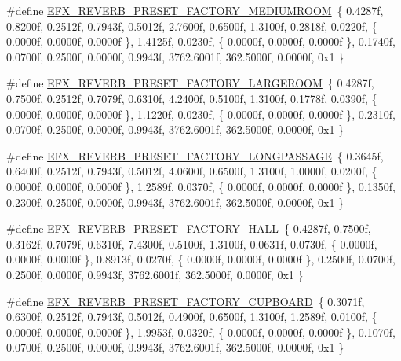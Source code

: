 \begin{DoxyCompactItemize}
\item 
\#define \hyperlink{efx-presets_8h_afdd5df2559d5c60aa4a4729412405d06}{E\+F\+X\+\_\+\+R\+E\+V\+E\+R\+B\+\_\+\+P\+R\+E\+S\+E\+T\+\_\+\+F\+A\+C\+T\+O\+R\+Y\+\_\+\+M\+E\+D\+I\+U\+M\+R\+O\+OM}~\{ 0.\+4287f, 0.\+8200f, 0.\+2512f, 0.\+7943f, 0.\+5012f, 2.\+7600f, 0.\+6500f, 1.\+3100f, 0.\+2818f, 0.\+0220f, \{ 0.\+0000f, 0.\+0000f, 0.\+0000f \}, 1.\+4125f, 0.\+0230f, \{ 0.\+0000f, 0.\+0000f, 0.\+0000f \}, 0.\+1740f, 0.\+0700f, 0.\+2500f, 0.\+0000f, 0.\+9943f, 3762.\+6001f, 362.\+5000f, 0.\+0000f, 0x1 \}
\item 
\#define \hyperlink{efx-presets_8h_a702eccce6fa335c50cd88b25585c99ed}{E\+F\+X\+\_\+\+R\+E\+V\+E\+R\+B\+\_\+\+P\+R\+E\+S\+E\+T\+\_\+\+F\+A\+C\+T\+O\+R\+Y\+\_\+\+L\+A\+R\+G\+E\+R\+O\+OM}~\{ 0.\+4287f, 0.\+7500f, 0.\+2512f, 0.\+7079f, 0.\+6310f, 4.\+2400f, 0.\+5100f, 1.\+3100f, 0.\+1778f, 0.\+0390f, \{ 0.\+0000f, 0.\+0000f, 0.\+0000f \}, 1.\+1220f, 0.\+0230f, \{ 0.\+0000f, 0.\+0000f, 0.\+0000f \}, 0.\+2310f, 0.\+0700f, 0.\+2500f, 0.\+0000f, 0.\+9943f, 3762.\+6001f, 362.\+5000f, 0.\+0000f, 0x1 \}
\item 
\#define \hyperlink{efx-presets_8h_a2e0c4cc4ac7d102d391c8edc50417df5}{E\+F\+X\+\_\+\+R\+E\+V\+E\+R\+B\+\_\+\+P\+R\+E\+S\+E\+T\+\_\+\+F\+A\+C\+T\+O\+R\+Y\+\_\+\+L\+O\+N\+G\+P\+A\+S\+S\+A\+GE}~\{ 0.\+3645f, 0.\+6400f, 0.\+2512f, 0.\+7943f, 0.\+5012f, 4.\+0600f, 0.\+6500f, 1.\+3100f, 1.\+0000f, 0.\+0200f, \{ 0.\+0000f, 0.\+0000f, 0.\+0000f \}, 1.\+2589f, 0.\+0370f, \{ 0.\+0000f, 0.\+0000f, 0.\+0000f \}, 0.\+1350f, 0.\+2300f, 0.\+2500f, 0.\+0000f, 0.\+9943f, 3762.\+6001f, 362.\+5000f, 0.\+0000f, 0x1 \}
\item 
\#define \hyperlink{efx-presets_8h_a77f1d495628c3b9943873adc18f5a979}{E\+F\+X\+\_\+\+R\+E\+V\+E\+R\+B\+\_\+\+P\+R\+E\+S\+E\+T\+\_\+\+F\+A\+C\+T\+O\+R\+Y\+\_\+\+H\+A\+LL}~\{ 0.\+4287f, 0.\+7500f, 0.\+3162f, 0.\+7079f, 0.\+6310f, 7.\+4300f, 0.\+5100f, 1.\+3100f, 0.\+0631f, 0.\+0730f, \{ 0.\+0000f, 0.\+0000f, 0.\+0000f \}, 0.\+8913f, 0.\+0270f, \{ 0.\+0000f, 0.\+0000f, 0.\+0000f \}, 0.\+2500f, 0.\+0700f, 0.\+2500f, 0.\+0000f, 0.\+9943f, 3762.\+6001f, 362.\+5000f, 0.\+0000f, 0x1 \}
\item 
\#define \hyperlink{efx-presets_8h_a92403add280fb6a386b7c72ad1a39d32}{E\+F\+X\+\_\+\+R\+E\+V\+E\+R\+B\+\_\+\+P\+R\+E\+S\+E\+T\+\_\+\+F\+A\+C\+T\+O\+R\+Y\+\_\+\+C\+U\+P\+B\+O\+A\+RD}~\{ 0.\+3071f, 0.\+6300f, 0.\+2512f, 0.\+7943f, 0.\+5012f, 0.\+4900f, 0.\+6500f, 1.\+3100f, 1.\+2589f, 0.\+0100f, \{ 0.\+0000f, 0.\+0000f, 0.\+0000f \}, 1.\+9953f, 0.\+0320f, \{ 0.\+0000f, 0.\+0000f, 0.\+0000f \}, 0.\+1070f, 0.\+0700f, 0.\+2500f, 0.\+0000f, 0.\+9943f, 3762.\+6001f, 362.\+5000f, 0.\+0000f, 0x1 \}

\end{DoxyCompactItemize}
